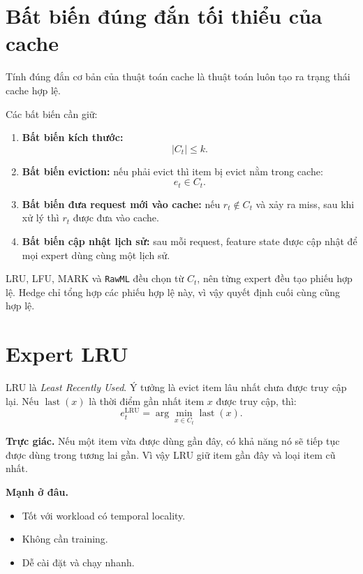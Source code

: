 \documentclass[11pt,a4paper]{article}
\newcommand{\code}[1]{\texttt{#1}}
\newcommand{\rawml}{\code{RawML}}
\begin{document}
\section{Bất biến đúng đắn tối thiểu của cache}

Tính đúng đắn cơ bản của thuật toán cache là thuật toán luôn tạo ra trạng thái cache hợp lệ.

Các bất biến cần giữ:

\begin{enumerate}[leftmargin=1.4em]
    \item \textbf{Bất biến kích thước:}
    \[
        |C_t|\le k.
    \]
    \item \textbf{Bất biến eviction:} nếu phải evict thì item bị evict nằm trong cache:
    \[
        e_t\in C_t.
    \]
    \item \textbf{Bất biến đưa request mới vào cache:} nếu \(r_t\notin C_t\) và xảy ra miss, sau khi xử lý thì \(r_t\) được đưa vào cache.
    \item \textbf{Bất biến cập nhật lịch sử:} sau mỗi request, feature state được cập nhật để mọi expert dùng cùng một lịch sử.
\end{enumerate}

LRU, LFU, MARK và \rawml{} đều chọn từ \(C_t\), nên từng expert đều tạo phiếu hợp lệ. Hedge chỉ tổng hợp các phiếu hợp lệ này, vì vậy quyết định cuối cùng cũng hợp lệ.

\section{Expert LRU}

LRU là \emph{Least Recently Used}. Ý tưởng là evict item lâu nhất chưa được truy cập lại. Nếu \(\operatorname{last}(x)\) là thời điểm gần nhất item \(x\) được truy cập, thì:
\[
    e_t^{\mathrm{LRU}}
    =
    \arg\min_{x\in C_t}\operatorname{last}(x).
\]

\textbf{Trực giác.} Nếu một item vừa được dùng gần đây, có khả năng nó sẽ tiếp tục được dùng trong tương lai gần. Vì vậy LRU giữ item gần đây và loại item cũ nhất.

\textbf{Mạnh ở đâu.}
\begin{itemize}[leftmargin=1.4em]
    \item Tốt với workload có temporal locality.
    \item Không cần training.
    \item Dễ cài đặt và chạy nhanh.
\end{itemize}
\end{document}
